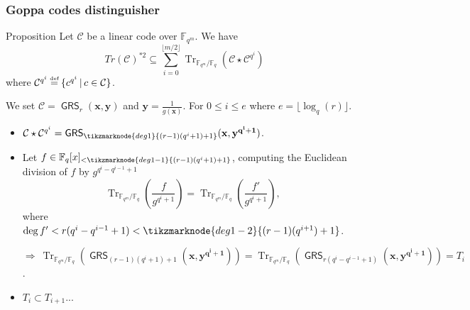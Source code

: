 \documentclass[
10pt, %
%
aspectratio=169, %
]{beamer}
\theoremstyle{plain}%
\theoremstyle{definition}
\theoremstyle{remark}
\newcommand{\calC}{\mathcal{C}}
\newcommand{\fqm}{\mathbb{F}_{q^m}}
\newcommand{\fq}{\mathbb{F}_{q}}
\newcommand{\Tr}[1]{\operatorname{Tr}_{\mathbb{F}_{q^m}/\fq}\left(#1\right)}
\newcommand{\GRS}{\operatorname{\mathsf{GRS}}}
\newcommand\myeq{\mathrel{\stackrel{\makebox[0pt]{\mbox{\normalfont\tiny def}}}{=}}}
\newcommand\highlightnode[2]{ %
	\node (#1-frame)[rounded corners,fit=(#1),inner sep=2pt,fill=#2,fill opacity=0.17] {};
}
\begin{document}
\begin{frame}
	\frametitle{Goppa codes distinguisher \cite{MT21}}
	\begin{block}{Proposition \cite{MT21}}
		Let $\calC$ be a linear code over $\fqm$. We have
		\vspace{-0.9em}
		$$Tr(\calC)^{*2}\subseteq \sum\limits_{i=0}^{\lfloor{m/2} \rfloor} \Tr{\calC\star \calC^{q^i}}$$
		where $\calC^{q^i} \myeq \{c^{q^i} \,| \, c \in \calC \}  $.
	\end{block}
	We set $\calC = \GRS_r(\mathbf{x},\mathbf{y})$ and $\mathbf{y}=\frac{1}{g(\mathbf{x})}$. For $0\leq i\leq e$ where $e=\lfloor \log_q(r)\rfloor$.
	\begin{itemize}
		\item $\calC\star \calC^{q^i}=\GRS_{\tikzmarknode{deg1}{(r-1)(q^i+1)+1}}(\mathbf{x},\mathbf{y^{q^i+1}})$.
		\item Let $f \in \fq[x]_{<\tikzmarknode{deg1-1}{(r-1)(q^i+1)+1}}$, computing the Euclidean division of $f$ by $g^{q^i -q^{i-1}+1}$
		\[ \Tr{\frac{f}{g^{q^i +1}}}=\Tr{\frac{f'}{g^{q^i +1}}},\]
		where $\deg f' < r(q^i -q^{i-1}+1)<\tikzmarknode{deg1-2}{(r-1)(q^{i
			+1})+1}$.
		
		$\Rightarrow \: \Tr{\GRS_{(r-1)(q^i+1)+1}(\mathbf{x},\mathbf{y^{q^i+1}})} = \Tr{\GRS_{r(q^i -q^{i-1}+1)}(\mathbf{x},\mathbf{y^{q^i+1}})} = T_i$.
		\item $T_i \subset T_{i+1}$...
	\end{itemize}


\end{frame}
\end{document}
